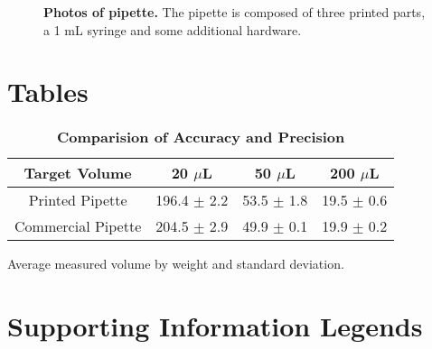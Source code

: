 \begin{figure}
\caption{
{\bf Photos of pipette.}  The pipette is composed of three printed parts, a 1 mL syringe and some additional hardware.  
}
\label{photo-parts-figure}
\end{figure}



\section*{Tables}
% 
%
%

\begin{table}[!ht]
\caption{
\bf{Comparision of Accuracy and Precision}}
\begin{tabular}{|c|c|c|c|}
\hline
    Target Volume & 20 $\mu$L & 50 $\mu$L & 200 $\mu$L  \\
    \hline
    Printed Pipette & 196.4 $\pm$ 2.2 & 53.5 $\pm$ 1.8 & 19.5 $\pm$ 0.6 \\
    Commercial Pipette & 204.5 $\pm$ 2.9 & 49.9 $\pm$ 0.1 & 19.9 $\pm$ 0.2 \\
    \hline
\end{tabular}
\begin{flushleft} Average measured volume by weight and standard deviation.
\end{flushleft}
\label{tab:comp}
 \end{table}

\section*{Supporting Information Legends}
%
% 



